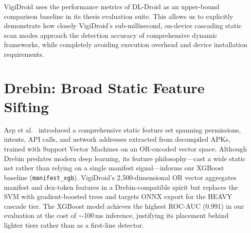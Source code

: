  VigiDroid uses the performance metrics of DL-Droid as an upper-bound comparison baseline in its thesis evaluation suite. This allows us to explicitly demonstrate how closely VigiDroid's sub-millisecond, on-device cascading static scan modes approach the detection accuracy of comprehensive dynamic frameworks, while completely avoiding execution overhead and device installation requirements.

\section{Drebin: Broad Static Feature Sifting}
Arp et al.~\cite{drebin} introduced a comprehensive static feature set spanning permissions, intents, API calls, and network addresses extracted from decompiled APKs, trained with Support Vector Machines on an OR-encoded vector space. Although Drebin predates modern deep learning, its feature philosophy---cast a wide static net rather than relying on a single manifest signal---informs our XGBoost baseline (\texttt{manifest\_xgb}). VigiDroid's 2,500-dimensional OR vector aggregates manifest and dex-token features in a Drebin-compatible spirit but replaces the SVM with gradient-boosted trees and targets ONNX export for the HEAVY cascade tier. The XGBoost model achieves the highest ROC-AUC (0.991) in our evaluation at the cost of $\sim$100\,ms inference, justifying its placement behind lighter tiers rather than as a first-line detector.


\endinput



